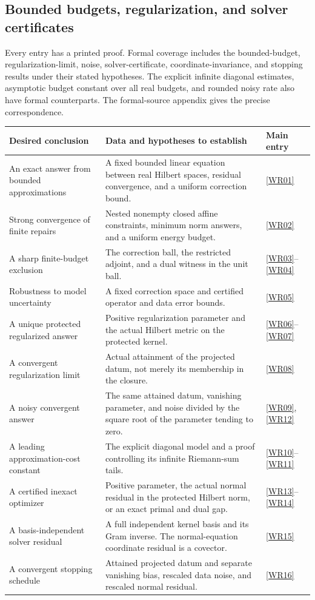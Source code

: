 \subsection{Bounded budgets, regularization, and solver certificates}
Every entry has a printed proof. Formal coverage includes the bounded-budget, regularization-limit, noise, solver-certificate, coordinate-invariance, and stopping results under their stated hypotheses. The explicit infinite diagonal estimates, asymptotic budget constant over all real budgets, and rounded noisy rate also have formal counterparts. The formal-source appendix gives the precise correspondence.
\begin{longtable}{@{}p{.24\linewidth}p{.48\linewidth}p{.21\linewidth}@{}}
\toprule Desired conclusion & Data and hypotheses to establish & Main entry\\\midrule\endhead
An exact answer from bounded approximations & A fixed bounded linear equation between real Hilbert spaces, residual convergence, and a uniform correction bound. & \ref{WR01}\\[4pt]
Strong convergence of finite repairs & Nested nonempty closed affine constraints, minimum norm answers, and a uniform energy budget. & \ref{WR02}\\[4pt]
A sharp finite-budget exclusion & The correction ball, the restricted adjoint, and a dual witness in the unit ball. & \ref{WR03}--\ref{WR04}\\[4pt]
Robustness to model uncertainty & A fixed correction space and certified operator and data error bounds. & \ref{WR05}\\[4pt]
A unique protected regularized answer & Positive regularization parameter and the actual Hilbert metric on the protected kernel. & \ref{WR06}--\ref{WR07}\\[4pt]
A convergent regularization limit & Actual attainment of the projected datum, not merely its membership in the closure. & \ref{WR08}\\[4pt]
A noisy convergent answer & The same attained datum, vanishing parameter, and noise divided by the square root of the parameter tending to zero. & \ref{WR09}, \ref{WR12}\\[4pt]
A leading approximation-cost constant & The explicit diagonal model and a proof controlling its infinite Riemann-sum tails. & \ref{WR10}--\ref{WR11}\\[4pt]
A certified inexact optimizer & Positive parameter, the actual normal residual in the protected Hilbert norm, or an exact primal and dual gap. & \ref{WR13}--\ref{WR14}\\[4pt]
A basis-independent solver residual & A full independent kernel basis and its Gram inverse. The normal-equation coordinate residual is a covector. & \ref{WR15}\\[4pt]
A convergent stopping schedule & Attained projected datum and separate vanishing bias, rescaled data noise, and rescaled normal residual. & \ref{WR16}\\\bottomrule
\end{longtable}

